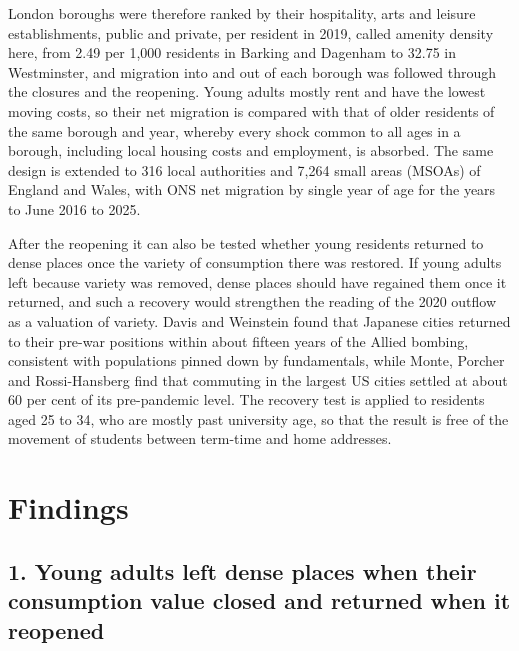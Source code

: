 \documentclass[11pt,a4paper]{article}
\begin{document}
London boroughs were therefore ranked by their hospitality, arts and leisure establishments, public and private, per resident in 2019, called amenity density here, from 2.49 per 1,000 residents in Barking and Dagenham to 32.75 in Westminster, and migration into and out of each borough was followed through the closures and the reopening. Young adults mostly rent and have the lowest moving costs, so their net migration is compared with that of older residents of the same borough and year, whereby every shock common to all ages in a borough, including local housing costs and employment, is absorbed. The same design is extended to 316 local authorities and 7,264 small areas (MSOAs) of England and Wales, with ONS net migration by single year of age for the years to June 2016 to 2025.

After the reopening it can also be tested whether young residents returned to dense places once the variety of consumption there was restored. If young adults left because variety was removed, dense places should have regained them once it returned, and such a recovery would strengthen the reading of the 2020 outflow as a valuation of variety. Davis and Weinstein found that Japanese cities returned to their pre-war positions within about fifteen years of the Allied bombing, consistent with populations pinned down by fundamentals, while Monte, Porcher and Rossi-Hansberg find that commuting in the largest US cities settled at about 60 per cent of its pre-pandemic level. The recovery test is applied to residents aged 25 to 34, who are mostly past university age, so that the result is free of the movement of students between term-time and home addresses.

\section{Findings}

\subsection*{1. Young adults left dense places when their consumption value closed and returned when it reopened}
\end{document}
